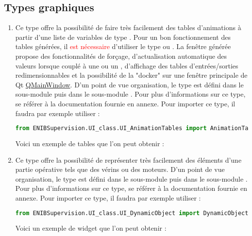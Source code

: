 \documentclass[12pt]{report}    %
\begin{document}
\newpage



\subsection{Types graphiques}

\begin{enumerate}

\item {}\newline
Ce type offre la possibilité de faire très facilement des tables d'animations à partir d'une liste de variables de type . Pour un bon fonctionnement des tables générées, il \textcolor{red}{est nécessaire} d'utiliser le type  ou .\newline
La fenêtre générée propose des fonctionnalités de forçage, d'actualisation automatique des valeurs lorsque couplé à une  ou un , d'affichage des tables d'entrées/sorties redimensionnables et la possibilité de la "docker" sur une fenêtre principale de Qt \href{https://doc.qt.io/qt-5/qmainwindow.html}{QMainWindow}.\newline
D'un point de vue organisation, le type  est défini dans le sous-module  puis dans le sous-module \newline {}.\newline
Pour plus d'informations sur ce type, se référer à la documentation fournie en annexe.\newline
Pour importer ce type, il faudra par exemple utiliser :
\begin{lstlisting}[language=Python]
from ENIBSupervision.UI_class.UI_AnimationTables import AnimationTables
\end{lstlisting}
Voici un exemple de tables que l'on peut obtenir :


\item {}\newline
Ce type offre la possibilité de représenter très facilement des éléments d'une partie opérative tels que des vérins ou des moteurs.\newline
D'un point de vue organisation, le type  est défini dans le sous-module  puis dans le sous-module \newline {}.\newline
Pour plus d'informations sur ce type, se référer à la documentation fournie en annexe.\newline
Pour importer ce type, il faudra par exemple utiliser :
\begin{lstlisting}[language=Python]
from ENIBSupervision.UI_class.UI_DynamicObject import DynamicObject
\end{lstlisting}
Voici un exemple de widget que l'on peut obtenir :


\end{enumerate}
\end{document}
